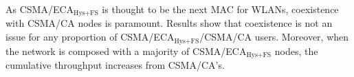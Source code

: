 \documentclass[a4paper,journal]{IEEEtran}
\begin{document}
As CSMA/ECA$_{\text{Hys+FS}}$ is thought to be the next MAC for WLANs, coexistence with CSMA/CA nodes is paramount. Results show that coexistence is not an issue for any proportion of CSMA/ECA$_{\text{Hys+FS}}$/CSMA/CA users. Moreover, when the network is composed with a majority of CSMA/ECA$_{\text{Hys+FS}}$ nodes, the cumulative throughput increases from CSMA/CA's.




\end{document}
